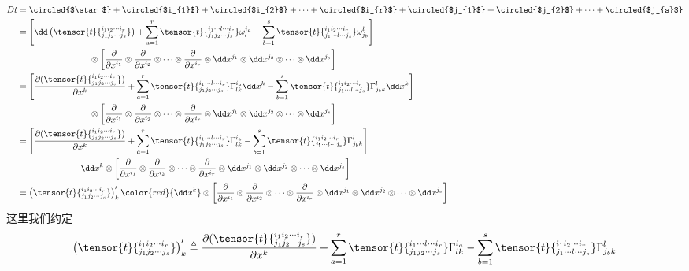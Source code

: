 \[
\begin{split}
Dt&=\circled{$\star$}+\circled{$i_{1}$}+\circled{$i_{2}$}+\cdots+\circled{$i_{r}$}+\circled{$j_{1}$}+\circled{$j_{2}$}+\cdots+\circled{$j_{s}$}\\
&=\left[\dd \left(\tensor{t}{^{i_{1}i_{2}\cdots i_{r}}_{j_{1}j_{2}\cdots j_{s}}}\right)+\sum_{a=1}^{r}\tensor{t}{^{i_{1}\cdots l\cdots i_{r}}_{j_{1}j_{2}\cdots j_{s}}}\omega_{l}^{i_{a}}-\sum_{b=1}^{s}\tensor{t}{^{i_{1}i_{2}\cdots i_{r}}_{j_{1}\cdots l\cdots j_{s}}}\omega_{j_{b}}^{l}\right]\\
&\quad\quad\quad\quad\quad\quad\quad\;\quad\otimes\left[\frac { \partial } { \partial x ^ { i_{1} } }\otimes\frac { \partial } { \partial x ^ { i_{2} } }\otimes\cdots\otimes\frac { \partial } { \partial x ^ { i_{r} } }\otimes   \dd x^{j_{1}}\otimes\dd x^{j_{2}}\otimes\cdots\otimes\dd x^{j_{s}} \right]\\
&=\left[\frac{{\partial}(\tensor{t}{^{i_{1}i_{2}\cdots i_{r}}_{j_{1}j_{2}\cdots j_{s}}})}{\partial x^{k}}+\sum_{a=1}^{r}\tensor{t}{^{i_{1}\cdots l\cdots i_{r}}_{j_{1}j_{2}\cdots j_{s}}}\Gamma_{lk}^{i_{a}}\dd x^{k}-\sum_{b=1}^{s}\tensor{t}{^{i_{1}i_{2}\cdots i_{r}}_{j_{1}\cdots l\cdots j_{s}}}\Gamma_{j_{b}k}^{l}\dd x^{k}\right]\\
&\quad\quad\quad\quad\quad\quad\quad\;\quad\otimes\left[\frac { \partial } { \partial x ^ { i_{1} } }\otimes\frac { \partial } { \partial x ^ { i_{2} } }\otimes\cdots\otimes\frac { \partial } { \partial x ^ { i_{r} } }\otimes   \dd x^{j_{1}}\otimes\dd x^{j_{2}}\otimes\cdots\otimes\dd x^{j_{s}} \right]\\
&=\left[\frac{{\partial}(\tensor{t}{^{i_{1}i_{2}\cdots i_{r}}_{j_{1}j_{2}\cdots j_{s}}})}{\partial x^{k}}+\sum_{a=1}^{r}\tensor{t}{^{i_{1}\cdots l\cdots i_{r}}_{j_{1}j_{2}\cdots j_{s}}}\Gamma_{lk}^{i_{a}}-\sum_{b=1}^{s}\tensor{t}{^{i_{1}i_{2}\cdots i_{r}}_{j_{1}\cdots l\cdots j_{s}}}\Gamma_{j_{b}k}^{l}\right]\\
&\quad\quad\quad\quad\quad\quad\;\quad\dd x^{k}\otimes\left[\frac { \partial } { \partial x ^ { i_{1} } }\otimes\frac { \partial } { \partial x ^ { i_{2} } }\otimes\cdots\otimes\frac { \partial } { \partial x ^ { i_{r} } }\otimes   \dd x^{j_{1}}\otimes\dd x^{j_{2}}\otimes\cdots\otimes\dd x^{j_{s}} \right]\\
&=\left(\tensor{t}{^{i_{1}i_{2}\cdots i_{r}}_{j_{1}j_{2}\cdots j_{s}}}\right)^{\prime}_{ k}{\color{red}{\dd x^{k}}}\otimes\left[\frac { \partial } { \partial x ^ { i_{1} } }\otimes\frac { \partial } { \partial x ^ { i_{2} } }\otimes\cdots\otimes\frac { \partial } { \partial x ^ { i_{r} } }\otimes   \dd x^{j_{1}}\otimes\dd x^{j_{2}}\otimes\cdots\otimes\dd x^{j_{s}} \right]
\end{split}
\]
这里我们约定
\begin{equation}
\left(\tensor{t}{^{i_{1}i_{2}\cdots i_{r}}_{j_{1}j_{2}\cdots j_{s}}}\right)^{\prime}_{ k}\triangleq \frac{{\partial}(\tensor{t}{^{i_{1}i_{2}\cdots i_{r}}_{j_{1}j_{2}\cdots j_{s}}})}{\partial x^{k}}+\sum_{a=1}^{r}\tensor{t}{^{i_{1}\cdots l\cdots i_{r}}_{j_{1}j_{2}\cdots j_{s}}}\Gamma_{lk}^{i_{a}}-\sum_{b=1}^{s}\tensor{t}{^{i_{1}i_{2}\cdots i_{r}}_{j_{1}\cdots l\cdots j_{s}}}\Gamma_{j_{b}k}^{l}
\end{equation}

